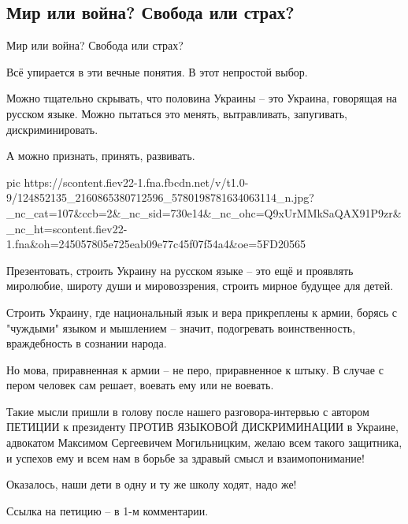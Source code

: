  
 
 
\subsection{Мир или война? Свобода или страх?}


Мир или война?  Свобода или страх?

Всё упирается в эти вечные понятия. В этот непростой выбор.

Можно тщательно скрывать, что половина Украины -- это Украина, говорящая на
русском языке. Можно пытаться это менять, вытравливать, запугивать,
дискриминировать. 

А можно признать, принять, развивать.

\ifcmt
pic https://scontent.fiev22-1.fna.fbcdn.net/v/t1.0-9/124852135_2160865380712596_5780198781634063114_n.jpg?_nc_cat=107&ccb=2&_nc_sid=730e14&_nc_ohc=Q9xUrMMkSaQAX91P9zr&_nc_ht=scontent.fiev22-1.fna&oh=245057805e725eab09e77c45f07f54a4&oe=5FD20565
\fi

Презентовать, строить Украину на русском языке -- это ещё и проявлять
миролюбие, широту души и мировоззрения, строить мирное будущее для детей.

Строить Украину, где национальный язык и вера прикреплены к армии, борясь с
"чуждыми" языком и мышлением -- значит, подогревать воинственность,
враждебность в сознании народа.

Но мова, приравненная к армии -- не перо, приравненное к штыку. В случае с
пером человек сам решает, воевать ему или не воевать. 

Такие мысли пришли в голову после нашего разговора-интервью с автором ПЕТИЦИИ к
президенту ПРОТИВ ЯЗЫКОВОЙ ДИСКРИМИНАЦИИ в Украине, адвокатом Максимом
Сергеевичем Могильницким, желаю всем такого защитника, и успехов ему и всем нам
в борьбе за здравый смысл и взаимопонимание! 

Оказалось, наши дети в одну и ту же школу ходят, надо же!

Ссылка на петицию -- в 1-м комментарии.

